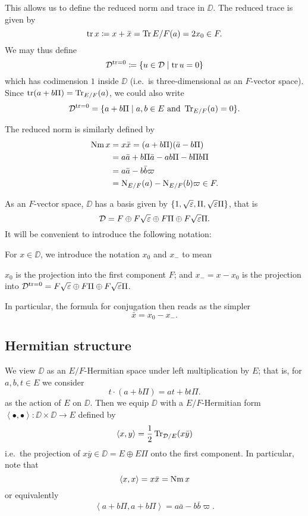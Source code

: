 This allows us to define the reduced norm and trace in $\DD$.
The reduced trace is given by
\[ \operatorname{tr} x \coloneqq x + \bar x = \operatorname{Tr}{E/F}(a) = 2x_0 \in F. \]
We may thus define
\[ \mathcal D^{\operatorname{tr} = 0} \coloneqq \left\{ u \in \mathcal D \mid \operatorname{tr} u = 0 \right\} \]
which has codimension $1$ inside $\DD$ (i.e.\ is three-dimensional as an $F$-vector space).
Since $\operatorname{tr}(a+b\Pi) = \operatorname{Tr}_{E/F}(a)$, we could also write
\[ \mathcal D^{\operatorname{tr} = 0} = \{ a+b\Pi \mid a,b \in E \text{ and } \operatorname{Tr}_{E/F}(a) = 0 \}. \]

The reduced norm is similarly defined by
\begin{align*}
  \operatorname{Nm} x &= x \bar x = (a + b \Pi)(\bar a - b \Pi) \\
  &= a \bar a + b \Pi \bar a - a b \Pi - b \Pi b \Pi \\
  &= a \bar a - b \bar b \varpi \\
  &= \operatorname{N}_{E/F}(a) - \operatorname{N}_{E/F}(b) \varpi \in F.
\end{align*}

As an $F$-vector space, $\DD$ has a basis given by
$\{1, \sqrt{\varepsilon}, \Pi, \sqrt{\varepsilon}\Pi\}$, that is
\[ \mathcal D = F \oplus F\sqrt{\varepsilon} \oplus F \Pi \oplus F\sqrt{\varepsilon}\Pi. \]
It will be convenient to introduce the following notation:
\begin{definition}
  For $x \in \DD$, we introduce the notation $x_0$ and $x_-$ to mean
  \begin{itemize}
    \ii $x_0$ is the projection into the first component $F$; and
    \ii $x_- = x - x_0$ is the projection into
    $\mathcal D^{\operatorname{tr} = 0} = F\sqrt{\varepsilon} \oplus F \Pi \oplus F\sqrt{\varepsilon}\Pi$.
  \end{itemize}
\end{definition}
In particular, the formula for conjugation then reads as the simpler
\[ \bar x = x_0 - x_-. \]

\subsection{Hermitian structure}
We view $\DD$ as an $E/F$-Hermitian space under left multiplication by $E$;
that is, for $a,b,t \in E$ we consider
\[ t \cdot (a + b \Pi) = a t + b t \Pi. \]
as the action of $E$ on $\DD$.
Then we equip $\DD$ with a $E/F$-Hermitian form
$\left\langle \bullet, \bullet \right\rangle \colon \DD \times \DD \to E$
defined by
\[ \left\langle x,y \right\rangle = \frac{1}{2} \operatorname{Tr}_{\mathcal D/E}(x \bar y) \]
i.e.\ the projection of $x \bar y \in \DD = E \oplus E\Pi$ onto the first component.
In particular, note that
\[ \left\langle x,x \right\rangle = x \bar{x} = \operatorname{Nm} x \]
or equivalently
\[ \left\langle a+b\Pi, a+b\Pi \right\rangle = a \bar a - b \bar b \varpi. \]

